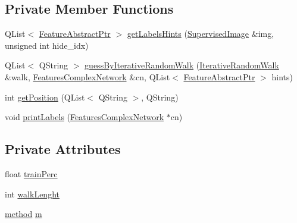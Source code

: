 \subsection*{Private Member Functions}
\begin{DoxyCompactItemize}
\item 
Q\+List$<$ \hyperlink{class_feature_abstract_ptr}{Feature\+Abstract\+Ptr} $>$ \hyperlink{class_label_guesser_experiment_a7ce6e72a0299f09f5d60911b6b2458b4}{get\+Labels\+Hints} (\hyperlink{class_supervised_image}{Supervised\+Image} \&img, unsigned int hide\+\_\+idx)
\item 
Q\+List$<$ Q\+String $>$ \hyperlink{class_label_guesser_experiment_a917b9b6d0fe6b874a60307e02a74de8e}{guess\+By\+Iterative\+Random\+Walk} (\hyperlink{class_iterative_random_walk}{Iterative\+Random\+Walk} \&walk, \hyperlink{class_features_complex_network}{Features\+Complex\+Network} \&cn, Q\+List$<$ \hyperlink{class_feature_abstract_ptr}{Feature\+Abstract\+Ptr} $>$ hints)
\item 
int \hyperlink{class_label_guesser_experiment_ae0a57bb59569d9bc69363a68f888f646}{get\+Position} (Q\+List$<$ Q\+String $>$, Q\+String)
\item 
void \hyperlink{class_label_guesser_experiment_a835363da6b06ec1402823493ef933179}{print\+Labels} (\hyperlink{class_features_complex_network}{Features\+Complex\+Network} $\ast$cn)
\end{DoxyCompactItemize}
\subsection*{Private Attributes}
\begin{DoxyCompactItemize}
\item 
float \hyperlink{class_label_guesser_experiment_a24da553164e05d31f67156c70b946fef}{train\+Perc}
\item 
int \hyperlink{class_label_guesser_experiment_a5038af94a1310577da234f589c19c77e}{walk\+Lenght}
\item 
\hyperlink{class_label_guesser_experiment_a8c3db06a56bf1ad7513c20a7b80da3ec}{method} \hyperlink{class_label_guesser_experiment_a0a0032a29818ba490865d85ac1403b0d}{m}
\end{DoxyCompactItemize}


